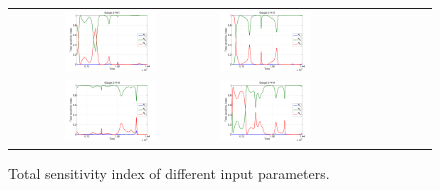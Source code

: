 \begin{figure}[h]
\begin{tabular}{clc}
\includegraphics[width=0.475\textwidth]{./figures/sens1.pdf} &
\includegraphics[width=0.475\textwidth]{./figures/sens2.pdf} \\
\includegraphics[width=0.475\textwidth]{./figures/sens3.pdf} &
\includegraphics[width=0.475\textwidth]{./figures/sens4.pdf}
\end{tabular}
\caption{Total sensitivity index of different input parameters.}
\label{fig:sens}
\end{figure}


